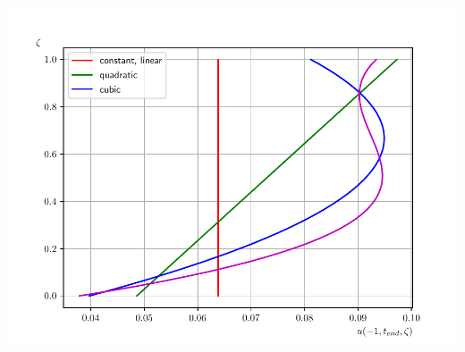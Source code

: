 \documentclass[10pt]{beamer}
\begin{document}
\begin{frame}
  \includegraphics[scale=0.29]{Figures/velocity_profile_-1_dam.pdf}
\end{frame}
\end{document}
